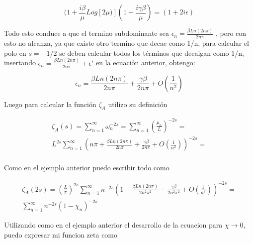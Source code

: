 \begin{equation}
(1 + \frac{i \beta}{ \mu} Log[2 \mu)] 
(1 + \frac{i  \gamma \beta}{ \mu})  =
(1 + 2 i \epsilon)
\end{equation}

Todo esto conduce a que el termino subdominante sea $\epsilon _n =  \frac{\beta Ln(2 n \pi)}{2 n \pi}$ , pero con esto no alcanza, ya que existe otro termino que decae como 1/n, para calcular el polo en $s=-1/2$ se deben calcular todos los términos que decaigan como 1/n, insertando $\epsilon _n =  \frac{\beta Ln(2 n \pi)}{2 n \pi} + \epsilon '$ en la ecuación anterior, obtengo:


\begin{equation}
    \epsilon _n =  \frac{\beta Ln(2 n \pi)}{2 n \pi} +
                \frac{\gamma \beta}{2 n \pi} +
                O(\frac{1}{n^2})
\end{equation}

Luego para calcular la función $\zeta _{A}$ utilizo su definición

\begin{equation}
\begin{array}{c}
    \zeta _A (s) = \sum _{n=1} ^{\infty} \omega _n ^{-2 s}  =
    \sum _{n=1} ^{\infty} \left(\frac{\mu _n}{L} \right) ^{-2 s} =  \\
    L ^{2 s} \sum _{n=1} ^{\infty} 
    \left( 
    n \pi + \frac{\beta Ln(2 n \pi)}{2 n \pi} + \frac{\gamma \beta}{2 n \pi} +
    O(\frac{1}{n^2})
    \right) ^{-2s} = \\
    
\end{array}
\end{equation}

Como en el ejemplo anterior puedo escribir todo como

\begin{equation}
\begin{array}{c}
    \zeta _A (2 s) = \left( \frac{L}{\pi} \right)  ^{2 s} 
    \sum _{n=1} ^{\infty} n ^{- 2  s}
    \left(
    1 - \frac{\beta Ln(2 n \pi)}{2 n^2 \pi ^2} - \frac{\gamma \beta}{2 n^2 \pi ^2 } +
    O \left( \frac{1}{n^3} \right)  \right) ^{-2 s} = \\
    \sum _{n=1} ^{\infty} n ^{-2 s} 
    \left(
    1 -\chi _n \right) ^{- 2 s}
\end{array}
\end{equation}

Utilizando como en el ejemplo anterior el desarrollo de la ecuacion para $\chi \rightarrow 0$, puedo expresar mi funcion zeta como 


